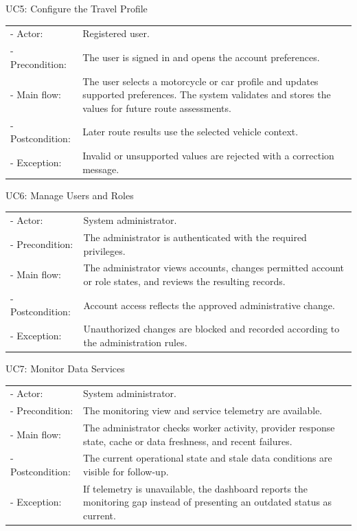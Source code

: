 \begin{samepage}
\noindent UC5: Configure the Travel Profile\par\medskip
\begin{tabularx}{\textwidth}{@{}p{2.75cm}@{\quad}X@{}}
- Actor: & Registered user. \\
- Precondition: & The user is signed in and opens the account preferences. \\
- Main flow: & The user selects a motorcycle or car profile and updates supported preferences. The system validates and stores the values for future route assessments. \\
- Postcondition: & Later route results use the selected vehicle context. \\
- Exception: & Invalid or unsupported values are rejected with a correction message. \\
\end{tabularx}
\medskip
\end{samepage}

\begin{samepage}
\noindent UC6: Manage Users and Roles\par\medskip
\begin{tabularx}{\textwidth}{@{}p{2.75cm}@{\quad}X@{}}
- Actor: & System administrator. \\
- Precondition: & The administrator is authenticated with the required privileges. \\
- Main flow: & The administrator views accounts, changes permitted account or role states, and reviews the resulting records. \\
- Postcondition: & Account access reflects the approved administrative change. \\
- Exception: & Unauthorized changes are blocked and recorded according to the administration rules. \\
\end{tabularx}
\medskip
\end{samepage}

\begin{samepage}
\noindent UC7: Monitor Data Services\par\medskip
\begin{tabularx}{\textwidth}{@{}p{2.75cm}@{\quad}X@{}}
- Actor: & System administrator. \\
- Precondition: & The monitoring view and service telemetry are available. \\
- Main flow: & The administrator checks worker activity, provider response state, cache or data freshness, and recent failures. \\
- Postcondition: & The current operational state and stale data conditions are visible for follow-up. \\
- Exception: & If telemetry is unavailable, the dashboard reports the monitoring gap instead of presenting an outdated status as current. \\
\end{tabularx}
\medskip
\end{samepage}

